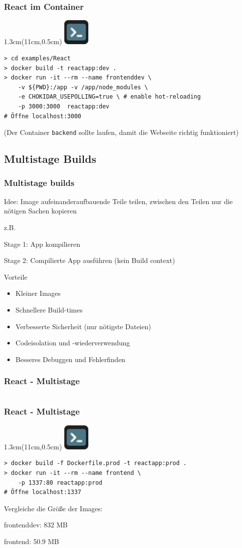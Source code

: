 \documentclass[22pt]{beamer}
\newcommand{\code}[1]{\colorbox{darkgray!20}{\texttt{#1}}}
\newcommand{\terminal}{
    \begin{textblock*}{1.3cm}(11cm,0.5cm) %
    \includegraphics[width=1.3cm]{Bilder/terminal2.png}
    \end{textblock*}
}
\begin{document}
\begin{frame}[fragile]
    \frametitle{React im Container}
    \terminal
\begin{verbatim}
> cd examples/React
> docker build -t reactapp:dev .
> docker run -it --rm --name frontenddev \
    -v ${PWD}:/app -v /app/node_modules \
    -e CHOKIDAR_USEPOLLING=true \ # enable hot-reloading
    -p 3000:3000  reactapp:dev
# Öffne localhost:3000

\end{verbatim}
\footnotesize (Der Container \code{backend} sollte laufen, damit die Webseite richtig funktioniert)
\end{frame}

\subsection{Multistage Builds}
\begin{frame}[t]
    \frametitle{Multistage builds}
    Idee: Image aufeinanderaufbauende Teile teilen, zwischen den Teilen nur die nötigen Sachen kopieren

    z.B. 
    
    Stage 1: App kompilieren
    
    Stage 2: Compilierte App ausführen (kein Build context) 
    \vspace{8pt}\pause

    Vorteile
    \begin{itemize}
        \item Kleiner Images
        \item Schnellere Build-times
        \item Verbesserte Sicherheit (nur nötigste Dateien)
        \item Codeisolation und -wiederverwendung
        \item Besseres Debuggen und Fehlerfinden
    \end{itemize} 
\end{frame}

\begin{frame}[fragile]
    \frametitle{React - Multistage}
    \inputminted[fontsize=\footnotesize, frame=lines]{dockerfile}{../examples/React/Dockerfile.prod}
\end{frame}

\begin{frame}[fragile]
    \frametitle{React - Multistage}
    \terminal
\begin{verbatim}
> docker build -f Dockerfile.prod -t reactapp:prod .
> docker run -it --rm --name frontend \
    -p 1337:80 reactapp:prod
# Öffne localhost:1337
\end{verbatim}
\pause
\vspace{8pt}
Vergleiche die Größe der Images:\pause

frontenddev: 832 MB

frontend: 50.9 MB

\end{frame}
\end{document}

